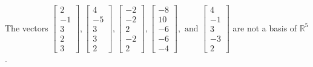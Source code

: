 \begin{exercise}
\begin{exerciseStatement}
  \end{exerciseStatement}
  \begin{exerciseAnswer}
   The vectors \(\left[\begin{array}{r}
2 \\
-1 \\
3 \\
2 \\
3
\end{array}\right] , \left[\begin{array}{r}
4 \\
-5 \\
3 \\
3 \\
2
\end{array}\right] , \left[\begin{array}{r}
-2 \\
-2 \\
2 \\
-2 \\
2
\end{array}\right] , \left[\begin{array}{r}
-8 \\
10 \\
-6 \\
-6 \\
-4
\end{array}\right] , \text{ and } \left[\begin{array}{r}
4 \\
-1 \\
3 \\
-3 \\
2
\end{array}\right]\) 
  	 are not  a basis of \(\mathbb{R}^5\).
  


  \end{exerciseAnswer}
\end{exercise}